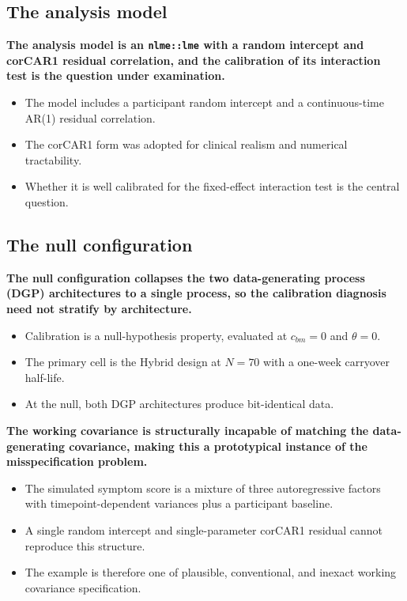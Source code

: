\documentclass[
  11pt,
]{article}
\begin{document}
\subsection{The analysis model}\label{the-analysis-model}

\textbf{The analysis model is an \texttt{nlme::lme} with a random intercept and corCAR1 residual correlation, and the calibration of its interaction test is the question under examination.}

\begin{itemize}\setlength{\itemsep}{2pt}\setlength{\parskip}{0pt}
\item The model includes a participant random intercept and a continuous-time AR(1) residual correlation.
\item The corCAR1 form was adopted for clinical realism and numerical tractability.
\item Whether it is well calibrated for the fixed-effect interaction test is the central question.
\end{itemize}

\subsection{The null configuration}\label{the-null-configuration}

\textbf{The null configuration collapses the two data-generating process (DGP) architectures to a single process, so the calibration diagnosis need not stratify by architecture.}

\begin{itemize}\setlength{\itemsep}{2pt}\setlength{\parskip}{0pt}
\item Calibration is a null-hypothesis property, evaluated at $c_{bm} = 0$ and $\theta = 0$.
\item The primary cell is the Hybrid design at $N = 70$ with a one-week carryover half-life.
\item At the null, both DGP architectures produce bit-identical data.
\end{itemize}

\textbf{The working covariance is structurally incapable of matching the data-generating covariance, making this a prototypical instance of the misspecification problem.}

\begin{itemize}\setlength{\itemsep}{2pt}\setlength{\parskip}{0pt}
\item The simulated symptom score is a mixture of three autoregressive factors with timepoint-dependent variances plus a participant baseline.
\item A single random intercept and single-parameter corCAR1 residual cannot reproduce this structure.
\item The example is therefore one of plausible, conventional, and inexact working covariance specification.
\end{itemize}
\end{document}
